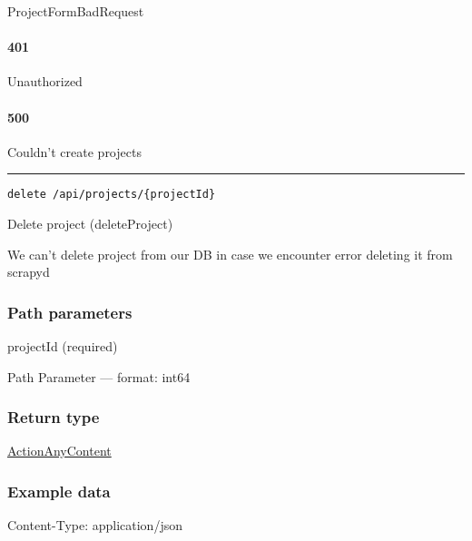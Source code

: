 ProjectFormBadRequest \protect\hyperlink{}{}

\hypertarget{section-61}{%
\paragraph{401}\label{section-61}}

Unauthorized \protect\hyperlink{}{}

\hypertarget{section-62}{%
\paragraph{500}\label{section-62}}

Couldn't create projects \protect\hyperlink{}{}

\begin{center}\rule{0.5\linewidth}{0.5pt}\end{center}

\protect\hypertarget{deleteProject}{}{}



\begin{verbatim}
delete /api/projects/{projectId}
\end{verbatim}

Delete project ({deleteProject})

We can't delete project from our DB in case we encounter error deleting
it from scrapyd

\hypertarget{path-parameters-15}{%
\subsubsection*{Path parameters}\label{path-parameters-15}}

projectId (required)

{Path Parameter} --- format: int64

\hypertarget{return-type-18}{%
\subsubsection*{Return type}\label{return-type-18}}

\protect\hyperlink{ActionAnyContent}{ActionAnyContent}

\hypertarget{example-data-18}{%
\subsubsection*{Example data}\label{example-data-18}}

Content-Type: application/json

